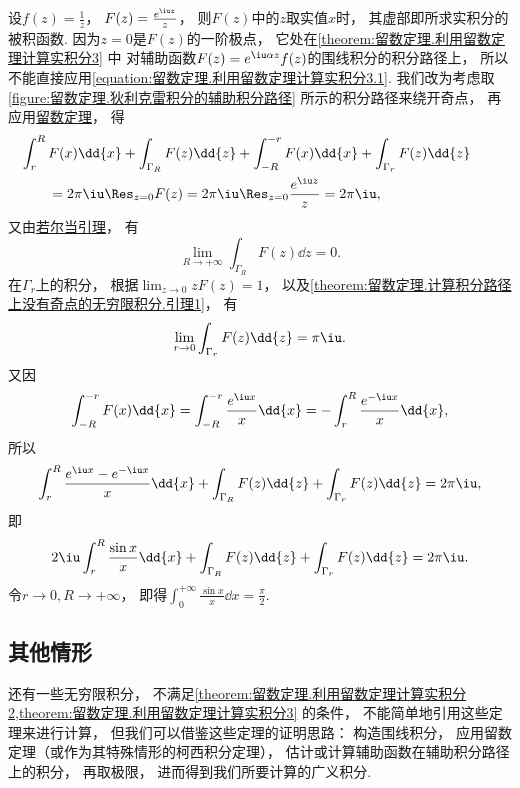 \begin{example}
\begin{solution}
设\(f(z) = \frac{1}{z}\)，
\(F(z) = \frac{e^{\iu z}}{z}\)，
则\(F(z)\)中的\(z\)取实值\(x\)时，
其虚部即所求实积分的被积函数.
因为\(z=0\)是\(F(z)\)的一阶极点，
它处在\cref{theorem:留数定理.利用留数定理计算实积分3} 中
对辅助函数\(F(z) = e^{\iu\alpha z} f(z)\)的围线积分的积分路径上，
所以不能直接应用\cref{equation:留数定理.利用留数定理计算实积分3.1}.
我们改为考虑取\cref{figure:留数定理.狄利克雷积分的辅助积分路径} 所示的积分路径来绕开奇点，
再应用\hyperref[theorem:留数定理.柯西留数定理]{留数定理}，
得\begin{align*}
	&\hspace{-20pt}\int_r^R F(x) \dd{x}
	+ \int_{\Gamma_R} F(z) \dd{z}
	+ \int_{-R}^{-r} F(x) \dd{x}
	+ \int_{\Gamma_r} F(z) \dd{z} \\
	&= 2\pi\iu \Res_{z=0} F(z)
	= 2\pi\iu \Res_{z=0} \frac{e^{\iu z}}{z}
	= 2\pi\iu,
\end{align*}
又由\hyperref[theorem:留数定理.计算积分路径上没有奇点的无穷限积分.引理2]{若尔当引理}，
有\begin{equation*}
	\lim_{R\to+\infty} \int_{\Gamma_R} F(z) \dd{z} = 0.
\end{equation*}
在\(\Gamma_r\)上的积分，
根据\(\lim_{z\to0} z F(z) = 1\)，
以及\cref{theorem:留数定理.计算积分路径上没有奇点的无穷限积分.引理1}，
有\begin{equation*}
	\lim_{r\to0} \int_{\Gamma_r} F(z) \dd{z} = \pi\iu.
\end{equation*}
又因\begin{equation*}
	\int_{-R}^{-r} F(x) \dd{x}
	= \int_{-R}^{-r} \frac{e^{\iu x}}{x} \dd{x}
	= -\int_r^R \frac{e^{-\iu x}}{x} \dd{x},
\end{equation*}
所以\begin{equation*}
	\int_r^R \frac{e^{\iu x} - e^{-\iu x}}{x} \dd{x}
	+ \int_{\Gamma_R} F(z) \dd{z}
	+ \int_{\Gamma_r} F(z) \dd{z}
	= 2\pi\iu,
\end{equation*}
即\begin{equation*}
	2\iu \int_r^R \frac{\sin x}{x} \dd{x}
	+ \int_{\Gamma_R} F(z) \dd{z}
	+ \int_{\Gamma_r} F(z) \dd{z}
	= 2\pi\iu.
\end{equation*}
令\(r\to0, R\to+\infty\)，
即得\(\int_0^{+\infty} \frac{\sin x}{x} \dd{x} = \frac{\pi}{2}\).
\end{solution}
\end{example}

\subsection{其他情形}
还有一些无穷限积分，
不满足\cref{theorem:留数定理.利用留数定理计算实积分2,theorem:留数定理.利用留数定理计算实积分3} 的条件，
不能简单地引用这些定理来进行计算，
但我们可以借鉴这些定理的证明思路：
构造围线积分，
应用留数定理（或作为其特殊情形的柯西积分定理），
估计或计算辅助函数在辅助积分路径上的积分，
再取极限，
进而得到我们所要计算的广义积分.

